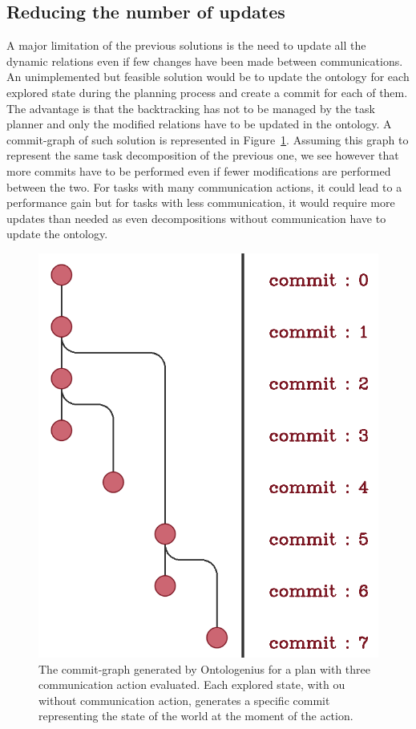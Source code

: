 \subsection{Reducing the number of updates}

A major limitation of the previous solutions is the need to update all the dynamic relations even if few changes have been made between communications. An unimplemented but feasible solution would be to update the ontology for each explored state during the planning process and create a commit for each of them. The advantage is that the backtracking has not to be managed by the task planner and only the modified relations have to be updated in the ontology. A commit-graph of such solution is represented in Figure~\ref{fig:chap5_versioning_advance}. Assuming this graph to represent the same task decomposition of the previous one, we see however that more commits have to be performed even if fewer modifications are performed between the two. For tasks with many communication actions, it could lead to a performance gain but for tasks with less communication, it would require more updates than needed as even decompositions without communication have to update the ontology.

\begin{figure}[!ht]
\centering
\includegraphics[scale=0.25]{figures/chapter5/versioning_advance.png}
\caption{\label{fig:chap5_versioning_advance} The commit-graph generated by Ontologenius for a plan with three communication action evaluated. Each explored state, with ou without communication action, generates a specific commit representing the state of the world at the moment of the action. }
\end{figure}

